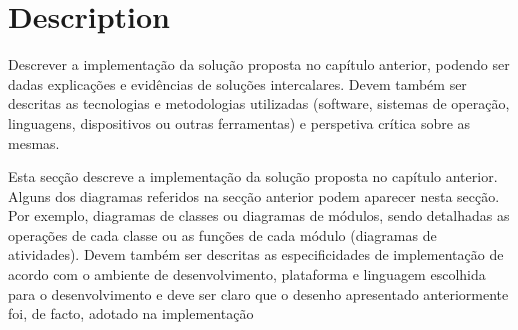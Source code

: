 \section{Description} %
\label{sec:impl_desc}

Descrever a implementação da solução proposta no capítulo anterior, podendo ser dadas explicações e evidências de soluções intercalares. Devem também ser descritas as tecnologias e metodologias utilizadas (software, sistemas de operação, linguagens, dispositivos ou outras ferramentas) e perspetiva crítica sobre as mesmas.

Esta secção descreve a implementação da solução proposta no capítulo anterior. Alguns dos diagramas referidos na secção anterior podem aparecer nesta secção. Por exemplo, diagramas de classes ou diagramas de módulos, sendo detalhadas as operações de cada classe ou as funções de cada módulo (diagramas de atividades). Devem também ser descritas as especificidades de implementação de acordo com o ambiente de desenvolvimento, plataforma e linguagem escolhida para o desenvolvimento e deve ser claro que o desenho apresentado anteriormente foi, de facto, adotado na implementação

